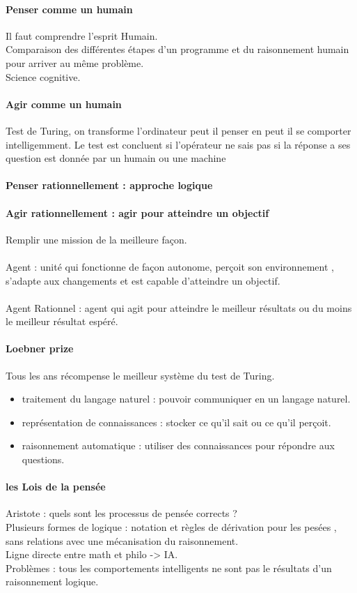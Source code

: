 \documentclass{article}
\begin{document}
\paragraph{Penser comme un humain} Il faut comprendre l'esprit Humain.\\Comparaison des différentes étapes d'un programme et du raisonnement humain pour arriver au même problème.\\Science cognitive.
\paragraph{Agir comme un humain} Test de Turing, on transforme l’ordinateur peut il penser en peut il se comporter intelligemment. Le test est concluent si l'opérateur ne sais pas si la réponse a ses question est donnée par un humain ou une machine
\paragraph{Penser rationnellement : approche logique}
\newpage
\paragraph{Agir rationnellement : agir pour atteindre un objectif}Remplir une mission de la meilleure façon.\\\\Agent : unité qui fonctionne de façon autonome, perçoit son environnement , s'adapte aux changements et est capable d'atteindre un objectif.\\\\Agent Rationnel : agent qui agit pour atteindre le meilleur résultats ou du moins le meilleur résultat espéré.
\paragraph{Loebner prize} Tous les ans récompense le meilleur système du test de Turing.
\begin{itemize}
\item traitement du langage naturel : pouvoir communiquer en un langage naturel.
\item représentation de connaissances : stocker ce qu'il sait ou ce qu'il perçoit.
\item raisonnement automatique : utiliser des connaissances pour répondre aux questions.
\end{itemize}

\paragraph{les Lois de la pensée}Aristote : quels sont les processus de pensée corrects ?\\Plusieurs formes de logique : notation et règles de dérivation pour les pesées , sans relations avec une mécanisation du raisonnement.\\Ligne directe entre math et philo -> IA.\\Problèmes : tous les comportements intelligents ne sont pas le résultats d'un raisonnement logique.\\
\end{document}
